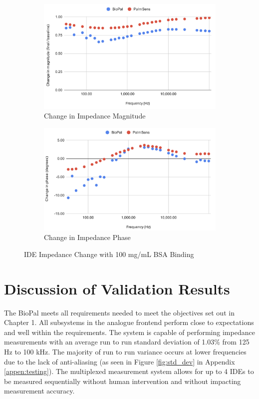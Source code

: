 \begin{figure}[H]
    \centering
    \begin{subfigure}{0.48\textwidth}
        \includegraphics[width=\textwidth]{10g:100mL mag.png}   
        \caption{Change in Impedance Magnitude}
        \label{fig:10g_mag}
    \end{subfigure}
    \hfill
    \begin{subfigure}{0.48\textwidth}
        \includegraphics[width=\textwidth]{10g:100mL phase.png}
        \caption{Change in Impedance Phase}
        \label{fig:10g_phase}
    \end{subfigure}
    \caption{IDE Impedance Change with 100 mg/mL BSA Binding}
    \label{fig:10g_bsa_comparison}
\end{figure}

\section{Discussion of Validation Results}
The BioPal meets all requirements needed to meet the objectives set out in Chapter 1. All subsystems in the analogue frontend perform close to expectations and well within the requirements. The system is capable of performing impedance measurements with an average run to run standard deviation of 1.03\% from 125 Hz to 100 kHz. The majority of run to run variance occurs at lower frequencies due to the lack of anti-aliasing (as seen in Figure \ref{fig:std_dev} in Appendix \ref{appen:testing}). The multiplexed measurement system allows for up to 4 \acp{IDE} to be measured sequentially without human intervention and without impacting measurement accuracy.

